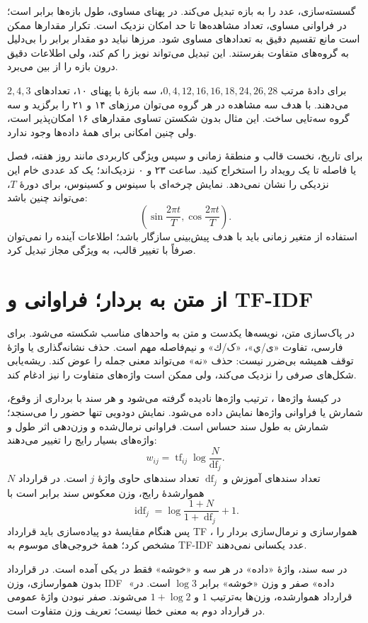 \documentclass[12pt,a4paper,oneside]{report}
\newcounter{ex}[chapter]
\newenvironment{example}[1]{\refstepcounter{ex}\begin{tcolorbox}[breakable=false,title={مثال \thechapter.\arabic{ex} | #1},colframe=muted,colback=white]}{\end{tcolorbox}}
\begin{document}
گسسته‌سازی، عدد را به بازه تبدیل می‌کند. در پهنای مساوی، طول بازه‌ها برابر است؛ در فراوانی مساوی، تعداد مشاهده‌ها تا حد امکان نزدیک است. تکرار مقدارها ممکن است مانع تقسیم دقیق به تعدادهای مساوی شود. مرزها نباید دو مقدار برابر را بی‌دلیل به گروه‌های متفاوت بفرستند. این تبدیل می‌تواند نویز را کم کند، ولی اطلاعات دقیق درون بازه را از بین می‌برد.

\begin{example}{دو روش بازه‌بندی}
برای دادهٔ مرتب $0,4,12,16,16,18,24,26,28$، سه بازهٔ با پهنای ۱۰، تعدادهای $2,4,3$ می‌دهند. با هدف سه مشاهده در هر گروه می‌توان مرزهای ۱۴ و ۲۱ را برگزید و سه گروه سه‌تایی ساخت. این مثال بدون شکستن تساوی مقدارهای ۱۶ امکان‌پذیر است، ولی چنین امکانی برای همهٔ داده‌ها وجود ندارد.
\end{example}

برای تاریخ، نخست قالب و منطقهٔ زمانی و سپس ویژگی کاربردی مانند روز هفته، فصل یا فاصله تا یک رویداد را استخراج کنید. ساعت ۲۳ و ۰ نزدیک‌اند؛ یک کد عددی خام این نزدیکی را نشان نمی‌دهد. نمایش چرخه‌ای با سینوس و کسینوس، برای دورهٔ $T$، می‌تواند چنین باشد:
\[\left(\sin\frac{2\pi t}{T},\cos\frac{2\pi t}{T}\right).\]
استفاده از متغیر زمانی باید با هدف پیش‌بینی سازگار باشد؛ اطلاعات آینده را نمی‌توان صرفاً با تغییر قالب، به ویژگی مجاز تبدیل کرد.

\section{از متن به بردار؛ فراوانی و TF-IDF}
در پاک‌سازی متن، نویسه‌ها یکدست و متن به واحدهای مناسب شکسته می‌شود. برای فارسی، تفاوت «ی/ي»، «ک/ك» و نیم‌فاصله مهم است. حذف نشانه‌گذاری یا واژهٔ توقف همیشه بی‌ضرر نیست: حذف «نه» می‌تواند معنی جمله را عوض کند. ریشه‌یابی شکل‌های صرفی را نزدیک می‌کند، ولی ممکن است واژه‌های متفاوت را نیز ادغام کند.

در کیسهٔ واژه‌ها ، ترتیب واژه‌ها نادیده گرفته می‌شود و هر سند با برداری از وقوع، شمارش یا فراوانی واژه‌ها نمایش داده می‌شود. نمایش دودویی تنها حضور را می‌سنجد؛ شمارش به طول سند حساس است. فراوانی نرمال‌شده و وزن‌دهی  اثر طول و واژه‌های بسیار رایج را تغییر می‌دهند:
\[w_{ij}=\operatorname{tf}_{ij}\log\frac{N}{\operatorname{df}_j}.\]
$N$ تعداد سندهای آموزش و $\operatorname{df}_j$ تعداد سندهای حاوی واژهٔ $j$ است. در قرارداد هموارشدهٔ رایج، وزن معکوس سند برابر است با
\[\operatorname{idf}_j=\log\frac{1+N}{1+\operatorname{df}_j}+1.\]
پس هنگام مقایسهٔ دو پیاده‌سازی باید قرارداد TF ، هموارسازی و نرمال‌سازی بردار را مشخص کرد؛ همهٔ خروجی‌های موسوم به TF-IDF عدد یکسانی نمی‌دهند.

\begin{example}{وزن واژهٔ عمومی و اختصاصی}
در سه سند، واژهٔ «داده» در هر سه و «خوشه» فقط در یکی آمده است. در قرارداد بدون هموارسازی، وزن IDF ِ «داده» صفر و وزن «خوشه» برابر $\log3$ است. در قرارداد هموارشده، وزن‌ها به‌ترتیب $1$ و $1+\log2$ می‌شوند. صفر نبودن واژهٔ عمومی در قرارداد دوم به معنی خطا نیست؛ تعریف وزن متفاوت است.
\end{example}
\end{document}

